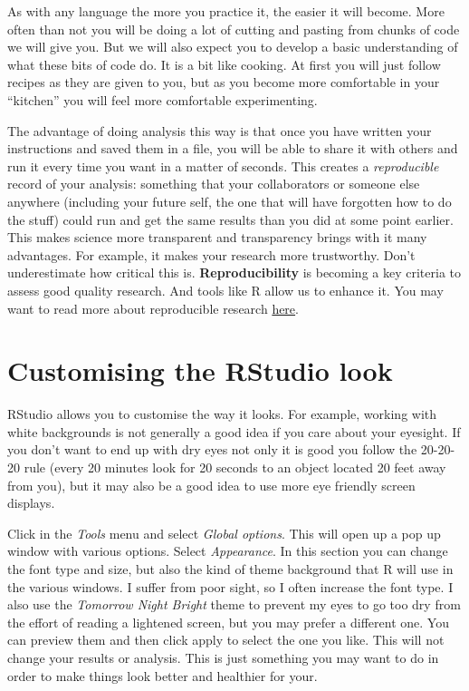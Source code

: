 \documentclass[
]{book}
\begin{document}
As with any language the more you practice it, the easier it will become. More often than not you will be doing a lot of cutting and pasting from chunks of code we will give you. But we will also expect you to develop a basic understanding of what these bits of code do. It is a bit like cooking. At first you will just follow recipes as they are given to you, but as you become more comfortable in your ``kitchen'' you will feel more comfortable experimenting.

The advantage of doing analysis this way is that once you have written your instructions and saved them in a file, you will be able to share it with others and run it every time you want in a matter of seconds. This creates a \emph{reproducible} record of your analysis: something that your collaborators or someone else anywhere (including your future self, the one that will have forgotten how to do the stuff) could run and get the same results than you did at some point earlier. This makes science more transparent and transparency brings with it many advantages. For example, it makes your research more trustworthy. Don't underestimate how critical this is. \textbf{Reproducibility} is becoming a key criteria to assess good quality research. And tools like R allow us to enhance it. You may want to read more about reproducible research \href{http://theconversation.com/the-science-reproducibility-crisis-and-what-can-be-done-about-it-74198}{here}.

\section{Customising the RStudio look}\label{customising-the-rstudio-look}

RStudio allows you to customise the way it looks. For example, working with white backgrounds is not generally a good idea if you care about your eyesight. If you don't want to end up with dry eyes not only it is good you follow the 20-20-20 rule (every 20 minutes look for 20 seconds to an object located 20 feet away from you), but it may also be a good idea to use more eye friendly screen displays.

Click in the \emph{Tools} menu and select \emph{Global options}. This will open up a pop up window with various options. Select \emph{Appearance}. In this section you can change the font type and size, but also the kind of theme background that R will use in the various windows. I suffer from poor sight, so I often increase the font type. I also use the \emph{Tomorrow Night Bright} theme to prevent my eyes to go too dry from the effort of reading a lightened screen, but you may prefer a different one. You can preview them and then click apply to select the one you like. This will not change your results or analysis. This is just something you may want to do in order to make things look better and healthier for your.
\end{document}
